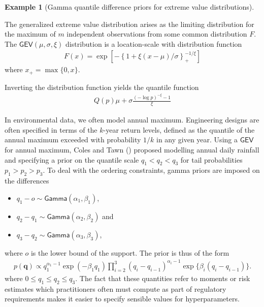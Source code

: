 \documentclass[
  11pt,
  letterpaper,
]{scrbook}
\providecommand{\tightlist}{%
  \setlength{\itemsep}{0pt}\setlength{\parskip}{0pt}}\usepackage{longtable,booktabs,array}
\theoremstyle{definition}
\theoremstyle{definition}
\newtheorem{example}{Example}[chapter]
\theoremstyle{definition}
\theoremstyle{plain}
\theoremstyle{plain}
\theoremstyle{remark}
\begin{document}
\begin{example}[Gamma quantile difference priors for extreme value
distributions]\protect\hypertarget{exm-colestawn}{}\label{exm-colestawn}

The generalized extreme value distribution arises as the limiting
distribution for the maximum of \(m\) independent observations from some
common distribution \(F\). The \(\mathsf{GEV}(\mu, \sigma, \xi)\)
distribution is a location-scale with distribution function
\begin{align*}
F(x) = \exp\left[ - \left\{1+\xi(x-\mu)/\sigma\right\}^{-1/\xi}_{+}\right]
\end{align*} where \(x_{+} = \max\{0, x\}\).

Inverting the distribution function yields the quantile function
\begin{align*}
Q(p) \mu + \sigma \frac{(-\log p)^{-\xi}-1}{\xi}
\end{align*}

In environmental data, we often model annual maximum. Engineering
designs are often specified in terms of the \(k\)-year return levels,
defined as the quantile of the annual maximum exceeded with probability
\(1/k\) in any given year. Using a \(\mathsf{GEV}\) for annual maximum,
Coles and Tawn () proposed modelling
annual daily rainfall and specifying a prior on the quantile scale
\(q_1 < q_2 < q_3\) for tail probabilities \(p_1> p_2 > p_3\). To deal
with the ordering constraints, gamma priors are imposed on the
differences

\begin{itemize}
\tightlist
\item
  \(q_1 - o \sim \mathsf{Gamma}(\alpha_1, \beta_1)\),
\item
  \(q_2 - q_1 \sim \mathsf{Gamma}(\alpha_2, \beta_2)\) and
\item
  \(q_3-q_2 \sim \mathsf{Gamma}(\alpha_3, \beta_3)\),
\end{itemize}

where \(o\) is the lower bound of the support. The prior is thus of the
form \begin{align*}
p(\boldsymbol{q}) \propto q_1^{\alpha_1-1}\exp(-\beta_1 q_1) \prod_{i=2}^3 (q_i-q_{i-1})^{\alpha_i-1} \exp\{\beta_i(q_i-q_{i-1})\}.
\end{align*} where \(0 \leq q_1 \leq q_2 \leq q_3\). The fact that these
quantities refer to moments or risk estimates which practitioners often
must compute as part of regulatory requirements makes it easier to
specify sensible values for hyperparameters.

\end{example}
\end{document}
